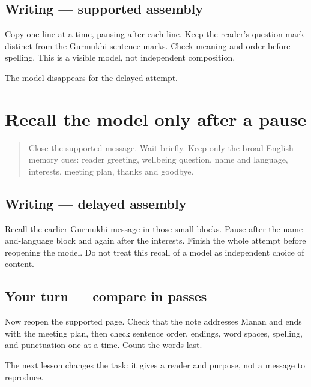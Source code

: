 \subsection*{Writing — supported assembly}
Copy one line at a time, pausing after each line. Keep the reader's question mark distinct from the Gurmukhi sentence marks. Check meaning and order before spelling. This is a visible model, not independent composition.

\begin{tcolorbox}[breakable,colback=teal!4,colframe=teal!35!black,title={Before you move on}]
The model disappears for the delayed attempt.
\end{tcolorbox}
\section[(delayed named-reader message)]{Recall the model only after a pause}

\label{lesson:PA-W12-message-delayed}



\begin{quote}
Close the supported message. Wait briefly. Keep only the broad English memory cues: reader greeting, wellbeing question, name and language, interests, meeting plan, thanks and goodbye.
\end{quote}

\subsection*{Writing — delayed assembly}
Recall the earlier Gurmukhi message in those small blocks. Pause after the name-and-language block and again after the interests. Finish the whole attempt before reopening the model. Do not treat this recall of a model as independent choice of content.

\subsection*{Your turn — compare in passes}
Now reopen the supported page. Check that the note addresses Manan and ends with the meeting plan, then check sentence order, endings, word spaces, spelling, and punctuation one at a time. Count the words last.

\begin{tcolorbox}[breakable,colback=teal!4,colframe=teal!35!black,title={Before you move on}]
The next lesson changes the task: it gives a reader and purpose, not a message to reproduce.
\end{tcolorbox}
